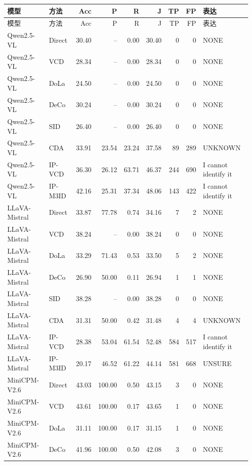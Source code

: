 \begingroup\fontsize{8.2}{10.5}\selectfont\setlength{\tabcolsep}{3.7pt}
\begin{longtable}{llrrrrrrl}
\toprule
模型 & 方法 & Acc & P & R & J & TP & FP & 表达\\
\midrule\endfirsthead
\toprule
模型 & 方法 & Acc & P & R & J & TP & FP & 表达\\
\midrule\endhead
\bottomrule\endfoot
Qwen2.5-VL & Direct & 30.40 & -- & 0.00 & 30.40 & 0 & 0 & NONE\\
Qwen2.5-VL & VCD & 28.34 & -- & 0.00 & 28.34 & 0 & 0 & NONE\\
Qwen2.5-VL & DoLa & 24.50 & -- & 0.00 & 24.50 & 0 & 0 & NONE\\
Qwen2.5-VL & DeCo & 30.24 & -- & 0.00 & 30.24 & 0 & 0 & NONE\\
Qwen2.5-VL & SID & 26.40 & -- & 0.00 & 26.40 & 0 & 0 & NONE\\
Qwen2.5-VL & CDA & 33.91 & 23.54 & 23.24 & 37.58 & 89 & 289 & UNKNOWN\\
Qwen2.5-VL & IP-VCD & 36.30 & 26.12 & 63.71 & 46.37 & 244 & 690 & I cannot identify it\\
Qwen2.5-VL & IP-M3ID & 42.16 & 25.31 & 37.34 & 48.06 & 143 & 422 & I cannot identify it\\
LLaVA-Mistral & Direct & 33.87 & 77.78 & 0.74 & 34.16 & 7 & 2 & NONE\\
LLaVA-Mistral & VCD & 38.24 & -- & 0.00 & 38.24 & 0 & 0 & NONE\\
LLaVA-Mistral & DoLa & 33.29 & 71.43 & 0.53 & 33.50 & 5 & 2 & NONE\\
LLaVA-Mistral & DeCo & 26.90 & 50.00 & 0.11 & 26.94 & 1 & 1 & NONE\\
LLaVA-Mistral & SID & 38.28 & -- & 0.00 & 38.28 & 0 & 0 & NONE\\
LLaVA-Mistral & CDA & 31.31 & 50.00 & 0.42 & 31.48 & 4 & 4 & UNKNOWN\\
LLaVA-Mistral & IP-VCD & 28.38 & 53.04 & 61.54 & 52.48 & 584 & 517 & I cannot identify it\\
LLaVA-Mistral & IP-M3ID & 20.17 & 46.52 & 61.22 & 44.14 & 581 & 668 & UNSURE\\
MiniCPM-V2.6 & Direct & 43.03 & 100.00 & 0.50 & 43.15 & 3 & 0 & NONE\\
MiniCPM-V2.6 & VCD & 43.61 & 100.00 & 0.17 & 43.65 & 1 & 0 & NONE\\
MiniCPM-V2.6 & DoLa & 31.11 & 100.00 & 0.17 & 31.15 & 1 & 0 & NONE\\
MiniCPM-V2.6 & DeCo & 41.96 & 100.00 & 0.50 & 42.08 & 3 & 0 & NONE\\

\end{longtable}
